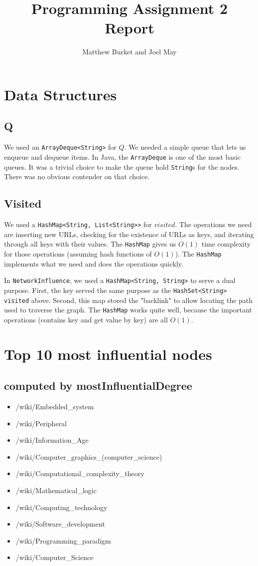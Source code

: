 \documentclass[10pt,letterpaper]{article}
\author{Matthew Burket and Joel May}
\title{Programming Assignment 2 Report}
\begin{document}
\maketitle

\section{Data Structures}
\subsection{Q}
We used an \texttt{ArrayDeque<String>} for $Q$. We needed a simple queue that lets us enqueue and dequeue items. In Java, the \texttt{ArrayDeque} is one of the most basic queues. It was a trivial choice to make the queue hold \texttt{String}s for the nodes. There was no obvious contender on that choice.
\subsection{Visited}
We used a \texttt{HashMap<String, List<String>>} for $visited$. The operations we need are inserting new URLs, checking for the existence of URLs as keys, and iterating through all keys with their values. The \texttt{HashMap} gives us $O(1)$ time complexity for those operations (assuming hash functions of $O(1)$). The \texttt{HashMap} implements what we need and does the operations quickly.

In \texttt{NetworkInfluence}, we used a \texttt{HashMap<String, String>} to serve a dual purpose. First, the key served the same purpose as the \texttt{HashSet<String> visited} above. Second, this map stored the "backlink" to allow locating the path used to traverse the graph. The \texttt{HashMap} works quite well, because the important operations (contains key and get value by key) are all $O(1)$.
\section{Top 10 most influential nodes}
\subsection{computed by mostInfluentialDegree}
\begin{itemize}
\item /wiki/Embedded\_system
\item /wiki/Peripheral
\item /wiki/Information\_Age
\item /wiki/Computer\_graphics\_(computer\_science)
\item /wiki/Computational\_complexity\_theory
\item /wiki/Mathematical\_logic
\item /wiki/Computing\_technology
\item /wiki/Software\_development
\item /wiki/Programming\_paradigm
\item /wiki/Computer\_Science
\end{itemize}
\end{document}
